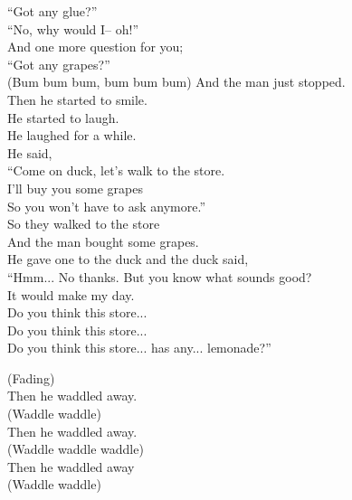 ``Got any glue?''\\
``No, why would I– oh!''\\
And one more question for you;\\
``Got any grapes?''\\
(Bum bum bum, bum bum bum)
\newpage
And the man just stopped.\\
Then he started to smile.\\
He started to laugh.\\
He laughed for a while.\\
He said,\\
``Come on duck, let’s walk to the store.\\
I’ll buy you some grapes\\
So you won't have to ask anymore.''\\
So they walked to the store\\
And the man bought some grapes.\\
He gave one to the duck and the duck said,\\
``Hmm... No thanks. But you know what sounds good?\\
It would make my day.\\
Do you think this store...\\
Do you think this store...\\
Do you think this store... has any... lemonade?''\par
\vspace{10pt}
(Fading)\\
Then he waddled away.\\
(Waddle waddle)\\
Then he waddled away.\\
(Waddle waddle waddle)\\
Then he waddled away\\
(Waddle waddle)
